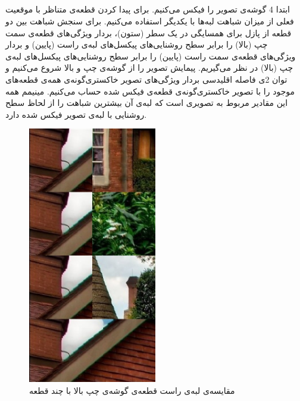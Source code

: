 \documentclass{article}
\begin{document}
\subsection{}
ابتدا 4 گوشه‌ی تصویر را فیکس می‌کنیم. برای پیدا کردن قطعه‌ی متناظر با موقعیت فعلی از میزان شباهت لبه‌ها با یکدیگر استفاده می‌کنیم. برای سنجش شباهت بین دو قطعه از پازل برای همسایگی در یک سطر (ستون)، بردار ویژگی‌های قطعه‌ی سمت چپ (بالا) را برابر سطح روشنایی‌های پیکسل‌های لبه‌ی راست (پایین) و بردار ویژگی‌های قطعه‌ی سمت راست (پایین) را برابر سطح روشنایی‌های پیکسل‌های لبه‌ی چپ (بالا) در نظر می‌گیریم. پیمایش تصویر را از گوشه‌ی چپ و بالا شروع می‌کنیم و توان 2ی فاصله اقلیدسی بردار ویژگی‌های تصویر خاکستری‌گونه‌ی همه‌ی قطعه‌های موجود را با تصویر خاکستری‌گونه‌ی قطعه‌ی فیکس شده حساب می‌کنیم. مینیمم همه این مقادیر مربوط به تصویری است که لبه‌ی آن بیشترین شباهت را از لحاظ سطح روشنایی با لبه‌ی تصویر فیکس شده دارد.
\begin{figure}[H]
    \centering
    \includegraphics[width=0.5\textwidth]{figures/1p3.jpg}
    \caption
	{
مقایسه‌ی لبه‌ی راست قطعه‌ی گوشه‌ی چپ بالا با چند قطعه
	}
    \label{fig:fig1}
\end{figure}
\end{document}
